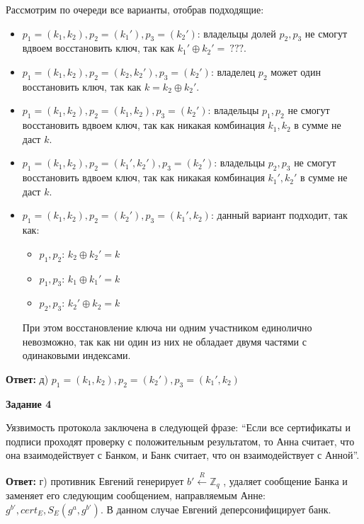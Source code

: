 \documentclass[12pt, a4paper]{extarticle}
\newenvironment*{dummyenv}{}{}
\newcommand{\mysection}[1]{
    \addcontentsline{toc}{section}{#1}
    \begin{dummyenv}
        \bfseries\large #1
    \end{dummyenv}
}
\begin{document}
Рассмотрим по очереди все варианты, отобрав подходящие:
\begin{itemize}
    \item $p_1 = (k_1, k_2), p_2 = (k_1'), p_3 = (k_2')$: владельцы долей $p_2, p_3$ не смогут 
    	вдвоем восстановить ключ, так как $k_1' \oplus k_2' =\ ???$.
    
    \item $p_1 = (k_1, k_2), p_2 = (k_2, k_2'), p_3 = (k_2')$: владелец $p_2$ может один 
    	восстановить ключ, так как $k = k_2 \oplus k_2'$.
    
    \item $p_1 = (k_1, k_2), p_2 = (k_1, k_2), p_3 = (k_2')$: владельцы $p_1, p_2$ не смогут 
    	восстановить вдвоем ключ, так как никакая комбинация $k_1, k_2$ в сумме не даст $k$.
    
    \item $p_1 = (k_1, k_2), p_2 = (k_1', k_2'), p_3 = (k_2')$: владельцы $p_2, p_3$ не смогут 
    	восстановить вдвоем ключ, так как никакая комбинация $k_1', k_2'$ в сумме не даст $k$.
        
    \item $p_1 = (k_1, k_2), p_2 = (k_2'), p_3 = (k_1', k_2)$: данный вариант подходит, так как:
        \begin{itemize}
            \item $p_1, p_2$: $k_2  \oplus k_2' = k$
            \item $p_1, p_3$: $k_1  \oplus k_1' = k$
            \item $p_2, p_3$: $k_2' \oplus k_2  = k$
        \end{itemize}
        При этом восстановление ключа ни одним участником единолично невозможно, так как ни один 
        из них не обладает двумя частями с одинаковыми индексами.
\end{itemize}
\textbf{Ответ:} д) $p_1 = (k_1, k_2), p_2 = (k_2'), p_3 = (k_1', k_2)$
\\

\mysection{Задание 4}

Уязвимость протокола заключена в следующей фразе: ``Если все сертификаты и подписи проходят проверку 
с положительным результатом, то Анна считает, что она взаимодействует с Банком, и Банк считает, что 
он взаимодействует с Анной''.

\textbf{Ответ:} г) противник Евгений генерирует $b' \xleftarrow{R} \mathbb{Z}_q$ , удаляет сообщение 
Банка и заменяет его следующим сообщением, направляемым Анне: $g^{b'}, cert_E, S_E(g^a, g^{b'})$.
В данном случае Евгений деперсонифицирует банк.
\\
\end{document}
